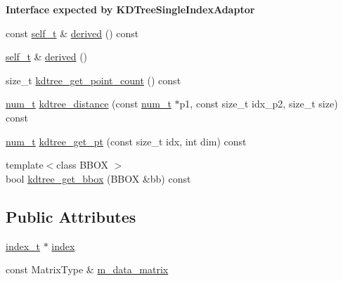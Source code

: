\begin{Indent}{\bf Interface expected by K\-D\-Tree\-Single\-Index\-Adaptor}\par
\begin{DoxyCompactItemize}
\item 
const \hyperlink{structnanoflann_1_1_k_d_tree_eigen_matrix_adaptor_a4c0c1ed66c119195d5d35f5a87bf54c5}{self\-\_\-t} \& \hyperlink{structnanoflann_1_1_k_d_tree_eigen_matrix_adaptor_ac5cf0acb494d2dc8b73344cca064dea5}{derived} () const 
\item 
\hyperlink{structnanoflann_1_1_k_d_tree_eigen_matrix_adaptor_a4c0c1ed66c119195d5d35f5a87bf54c5}{self\-\_\-t} \& \hyperlink{structnanoflann_1_1_k_d_tree_eigen_matrix_adaptor_a43e60e048c63828962b2bb1ab05bee48}{derived} ()
\item 
size\-\_\-t \hyperlink{structnanoflann_1_1_k_d_tree_eigen_matrix_adaptor_a6e62f48b067b34f659a39bc3042964e8}{kdtree\-\_\-get\-\_\-point\-\_\-count} () const 
\item 
\hyperlink{structnanoflann_1_1_k_d_tree_eigen_matrix_adaptor_a5198c559d4134cbb14767e10d6945748}{num\-\_\-t} \hyperlink{structnanoflann_1_1_k_d_tree_eigen_matrix_adaptor_affa6f8572c281a4ee986372fc232c855}{kdtree\-\_\-distance} (const \hyperlink{structnanoflann_1_1_k_d_tree_eigen_matrix_adaptor_a5198c559d4134cbb14767e10d6945748}{num\-\_\-t} $\ast$p1, const size\-\_\-t idx\-\_\-p2, size\-\_\-t size) const 
\item 
\hyperlink{structnanoflann_1_1_k_d_tree_eigen_matrix_adaptor_a5198c559d4134cbb14767e10d6945748}{num\-\_\-t} \hyperlink{structnanoflann_1_1_k_d_tree_eigen_matrix_adaptor_ab5aa1b4ec362b8818c4c66f5a86fe340}{kdtree\-\_\-get\-\_\-pt} (const size\-\_\-t idx, int dim) const 
\item 
{\footnotesize template$<$class B\-B\-O\-X $>$ }\\bool \hyperlink{structnanoflann_1_1_k_d_tree_eigen_matrix_adaptor_a0ac158cf53c71f120173cb975fe79139}{kdtree\-\_\-get\-\_\-bbox} (B\-B\-O\-X \&bb) const 
\end{DoxyCompactItemize}
\end{Indent}
\subsection*{Public Attributes}
\begin{DoxyCompactItemize}
\item 
\hyperlink{structnanoflann_1_1_k_d_tree_eigen_matrix_adaptor_abe94a08556e96937c80f8e13ba668b6b}{index\-\_\-t} $\ast$ \hyperlink{structnanoflann_1_1_k_d_tree_eigen_matrix_adaptor_a171c13d72cca6020775ae1d15ea2f935}{index}
\item 
const Matrix\-Type \& \hyperlink{structnanoflann_1_1_k_d_tree_eigen_matrix_adaptor_a003a066551cff2038b11efc66633d0f8}{m\-\_\-data\-\_\-matrix}
\end{DoxyCompactItemize}


